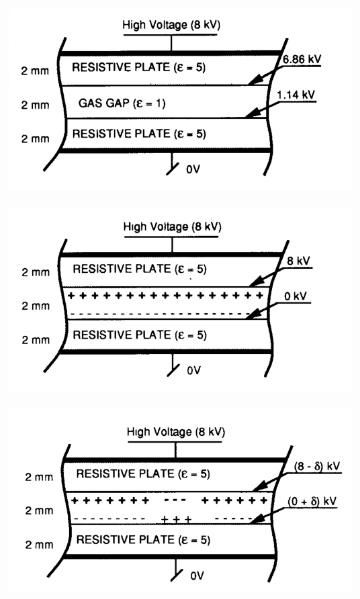 \begingroup\setlength{\intextsep}{0pt}\setlength{\columnsep}{15pt}
	
	\begin{figure}
		\begin{subfigure}{\linewidth}
			\centering
			\includegraphics[width = \linewidth]{fig/chapt3/RPC_Charging_1.png}
			\caption{\label{fig:ElecCharge:A}}
		\end{subfigure}
		\begin{subfigure}{\linewidth}
			\centering
			\includegraphics[width = \linewidth]{fig/chapt3/RPC_Charging_2.png}\\
			\caption{\label{fig:ElecCharge:B}}
		\end{subfigure}
		\begin{subfigure}{\linewidth}
			\centering
			\includegraphics[width = \linewidth]{fig/chapt3/RPC_Charging_3.png}

\end{subfigure}
\end{figure}
